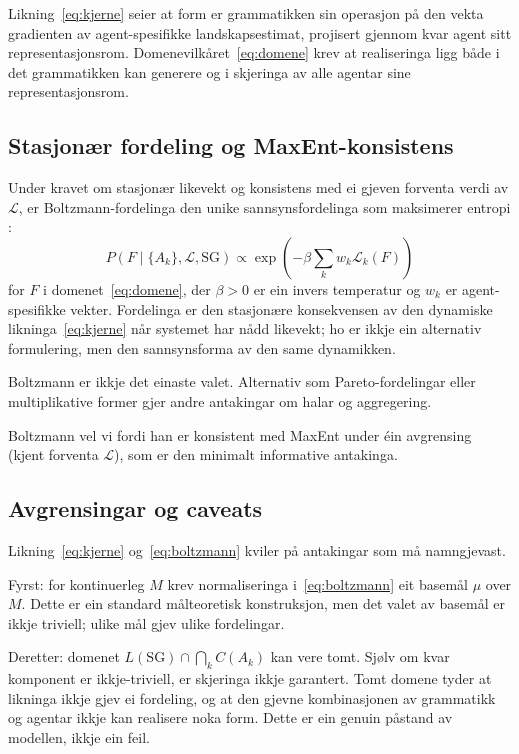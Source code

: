 \documentclass[10pt,a4paper,twocolumn]{article}
\begin{document}
Likning~\ref{eq:kjerne} seier at form er grammatikken sin operasjon på den vekta gradienten av agent-spesifikke landskapsestimat, projisert gjennom kvar agent sitt representasjonsrom. Domenevilkåret~\ref{eq:domene} krev at realiseringa ligg både i det grammatikken kan generere og i skjeringa av alle agentar sine representasjonsrom.

\subsection{Stasjonær fordeling og MaxEnt-konsistens}

Under kravet om stasjonær likevekt og konsistens med ei gjeven forventa verdi av $\mathcal{L}$, er Boltzmann-fordelinga den unike sannsynsfordelinga som maksimerer entropi \citep{jaynes1957}:
\begin{equation}
P(F \mid \{A_k\}, \mathcal{L}, \mathrm{SG}) \propto \exp\!\left(-\beta \sum_k w_k \mathcal{L}_k(F)\right)
\label{eq:boltzmann}
\end{equation}
for $F$ i domenet~\ref{eq:domene}, der $\beta > 0$ er ein invers temperatur og $w_k$ er agent-spesifikke vekter. Fordelinga er den stasjonære konsekvensen av den dynamiske likninga~\ref{eq:kjerne} når systemet har nådd likevekt; ho er ikkje ein alternativ formulering, men den sannsynsforma av den same dynamikken.

Boltzmann er ikkje det einaste valet. Alternativ som Pareto-fordelingar eller multiplikative former gjer andre antakingar om halar og aggregering.

Boltzmann vel vi fordi han er konsistent med MaxEnt under éin avgrensing (kjent forventa $\mathcal{L}$), som er den minimalt informative antakinga.

\subsection{Avgrensingar og caveats}

Likning~\ref{eq:kjerne} og~\ref{eq:boltzmann} kviler på antakingar som må namngjevast.

Fyrst: for kontinuerleg $M$ krev normaliseringa i~\ref{eq:boltzmann} eit basemål $\mu$ over $M$. Dette er ein standard målteoretisk konstruksjon, men det valet av basemål er ikkje triviell; ulike mål gjev ulike fordelingar.

Deretter: domenet $L(\mathrm{SG}) \cap \bigcap_k C(A_k)$ kan vere tomt. Sjølv om kvar komponent er ikkje-triviell, er skjeringa ikkje garantert. Tomt domene tyder at likninga ikkje gjev ei fordeling, og at den gjevne kombinasjonen av grammatikk og agentar ikkje kan realisere noka form. Dette er ein genuin påstand av modellen, ikkje ein feil.
\end{document}
